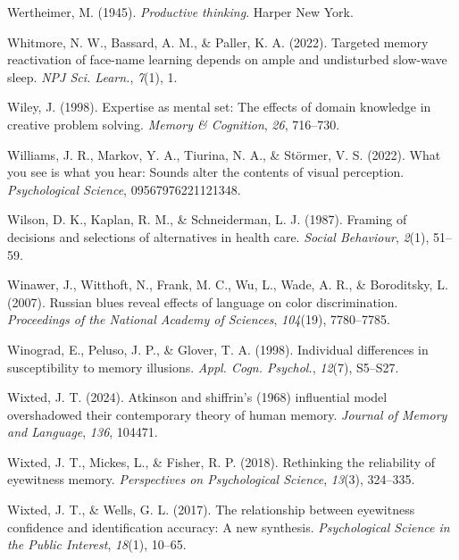 \documentclass[
]{krantz}
\newlength{\cslhangindent}
\newenvironment{CSLReferences}[2] %
 {\begin{list}{}{%
  \setlength{\itemindent}{0pt}
  \setlength{\leftmargin}{0pt}
  \setlength{\parsep}{0pt}
  \ifodd #1
   \setlength{\leftmargin}{\cslhangindent}
   \setlength{\itemindent}{-1\cslhangindent}
  \fi
  \setlength{\itemsep}{#2\baselineskip}}}
 {\end{list}}
\begin{document}
\begin{CSLReferences}{1}{0}
Wertheimer, M. (1945). \emph{Productive thinking}. Harper New York.

Whitmore, N. W., Bassard, A. M., \& Paller, K. A. (2022). Targeted memory reactivation of face-name learning depends on ample and undisturbed slow-wave sleep. \emph{NPJ Sci. Learn.}, \emph{7}(1), 1.

Wiley, J. (1998). Expertise as mental set: The effects of domain knowledge in creative problem solving. \emph{Memory \& Cognition}, \emph{26}, 716--730.

Williams, J. R., Markov, Y. A., Tiurina, N. A., \& Störmer, V. S. (2022). What you see is what you hear: Sounds alter the contents of visual perception. \emph{Psychological Science}, 09567976221121348.

Wilson, D. K., Kaplan, R. M., \& Schneiderman, L. J. (1987). Framing of decisions and selections of alternatives in health care. \emph{Social Behaviour}, \emph{2}(1), 51--59.

Winawer, J., Witthoft, N., Frank, M. C., Wu, L., Wade, A. R., \& Boroditsky, L. (2007). Russian blues reveal effects of language on color discrimination. \emph{Proceedings of the National Academy of Sciences}, \emph{104}(19), 7780--7785.

Winograd, E., Peluso, J. P., \& Glover, T. A. (1998). Individual differences in susceptibility to memory illusions. \emph{Appl. Cogn. Psychol.}, \emph{12}(7), S5--S27.

Wixted, J. T. (2024). Atkinson and shiffrin's (1968) influential model overshadowed their contemporary theory of human memory. \emph{Journal of Memory and Language}, \emph{136}, 104471.

Wixted, J. T., Mickes, L., \& Fisher, R. P. (2018). Rethinking the reliability of eyewitness memory. \emph{Perspectives on Psychological Science}, \emph{13}(3), 324--335.

Wixted, J. T., \& Wells, G. L. (2017). The relationship between eyewitness confidence and identification accuracy: A new synthesis. \emph{Psychological Science in the Public Interest}, \emph{18}(1), 10--65.


\end{CSLReferences}
\end{document}
